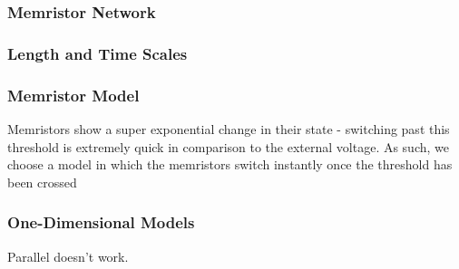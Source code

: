 \documentclass[mathserif]{beamer}
\begin{document}
\begin{frame}
\frametitle{Memristor Network}


\end{frame}

\begin{frame}
\frametitle{Length and Time Scales}


\end{frame}

\begin{frame}
\frametitle{Memristor Model}
Memristors show a super exponential change in their state - switching past
this threshold is extremely quick in comparison to the external voltage.  As such,
we choose a model in which the memristors switch instantly once the threshold has
been crossed
\end{frame}

\begin{frame}
\frametitle{One-Dimensional Models}
Parallel doesn't work.


\end{frame}
\end{document}
